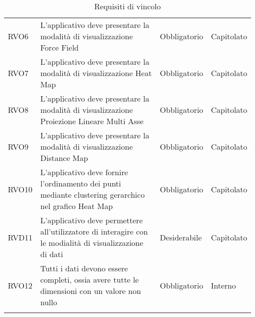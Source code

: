 \begin{longtable}[H]{>{\raggedright\arraybackslash}p{20mm} p{90mm} p{22mm} p{30mm}}
    RVO6
        & L'applicativo deve presentare la modalità di visualizzazione Force Field
        & Obbligatorio
        & Capitolato \\

    RVO7
        & L'applicativo deve presentare la modalità di visualizzazione Heat Map
        & Obbligatorio
        & Capitolato \\

    RVO8
        & L'applicativo deve presentare la modalità di visualizzazione Proiezione Lineare Multi Asse
        & Obbligatorio
        & Capitolato \\

    RVO9
        & L'applicativo deve presentare la modalità di visualizzazione Distance Map
        & Obbligatorio
        & Capitolato \\

    RVO10
        & L'applicativo deve fornire l'ordinamento dei punti mediante clustering gerarchico nel grafico Heat Map
        & Obbligatorio
        & Capitolato \\

    RVD11
        & L'applicativo deve permettere all'utilizzatore di interagire con le modialità di visualizzazione di dati
        & Desiderabile
        & Capitolato \\

    RVO12 &
        Tutti i dati devono essere completi, ossia avere tutte le dimensioni con un valore
        non nullo &
        Obbligatorio &
        Interno \\

    \caption{Requisiti di vincolo}%
    \label{tab:requisiti_di_vincolo}
\end{longtable}
